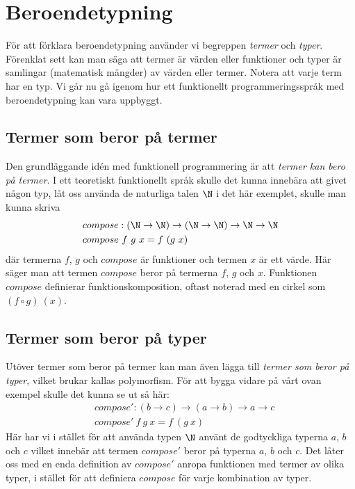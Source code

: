 \section{Beroendetypning}
För att förklara beroendetypning använder vi begreppen \emph{termer} och
\emph{typer}. Förenklat sett kan man säga att termer är värden eller funktioner
och typer är samlingar (matematisk mängder) av värden eller termer. Notera att
varje term har en typ. Vi går nu gå igenom hur ett funktionellt
programmeringsspråk med beroendetypning kan vara uppbyggt.

\subsection{Termer som beror på termer}
Den grundläggande idén med funktionell programmering är att \emph{termer kan
bero på termer}. I ett teoretiskt funktionellt språk skulle det kunna innebära
att givet någon typ, låt oss använda de naturliga talen $\N$ i det här
exemplet, skulle man kunna skriva
\begin{align*}
  &compose : (\N \to \N) \to (\N \to \N) \to \N \to \N \\
  &compose\ f\ g\ x = f\ (g\ x)
\end{align*}
där termerna $f$, $g$ och $compose$ är funktioner och termen $x$ är ett värde.
Här säger man att termen $compose$ beror på termerna $f$, $g$ och $x$.
Funktionen $compose$ definierar funktionskomposition, oftast noterad med en
cirkel som $(f \circ g)\ (x)$.


\subsection{Termer som beror på typer}
Utöver termer som beror på termer kan man även lägga till \emph{termer som
beror på typer}, vilket brukar kallas polymorfism. För att bygga vidare på vårt
ovan exempel skulle det kunna se ut så här:
\begin{align*}
  &compose' : (b \to c) \to (a \to b) \to a \to c \\
  &compose'\ f\ g\ x = f\ (g\ x)
\end{align*}
Här har vi i stället för att använda typen $\N$ använt de godtyckliga typerna
$a$, $b$ och $c$ vilket innebär att termen $compose'$ beror på typerna $a$, $b$
och $c$. Det låter oss med en enda definition av $compose'$ anropa funktionen
med termer av olika typer, i stället för att definiera $compose$ för varje
kombination av typer.

